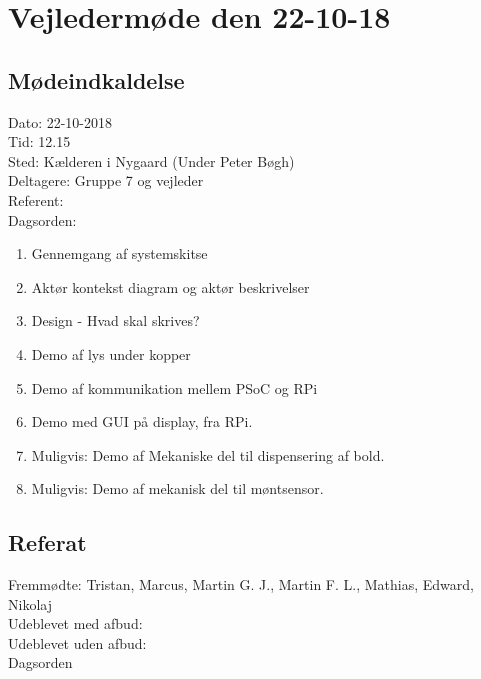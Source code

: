 \section{Vejledermøde den 22-10-18}
\subsection{Mødeindkaldelse}
Dato: 22-10-2018
\\Tid: 12.15
\\Sted: Kælderen i Nygaard (Under Peter Bøgh)
\\Deltagere: Gruppe 7 og vejleder
\\Referent: 
\\Dagsorden: 
\begin{enumerate}
    \item Gennemgang af systemskitse
    \item Aktør kontekst diagram og aktør beskrivelser
    \item Design - Hvad skal skrives?
    \item Demo af lys under kopper
    \item Demo af kommunikation mellem PSoC og RPi
    \item Demo med GUI på display, fra RPi.
    \item Muligvis: Demo af Mekaniske del til dispensering af bold.
    \item Muligvis: Demo af mekanisk del til møntsensor.
    
\end{enumerate}

\subsection{Referat}
 Fremmødte: Tristan, Marcus, Martin G. J., Martin F. L., Mathias, Edward, Nikolaj 
 \\Udeblevet med afbud:
 \\Udeblevet uden afbud: 
 \\Dagsorden 
 
